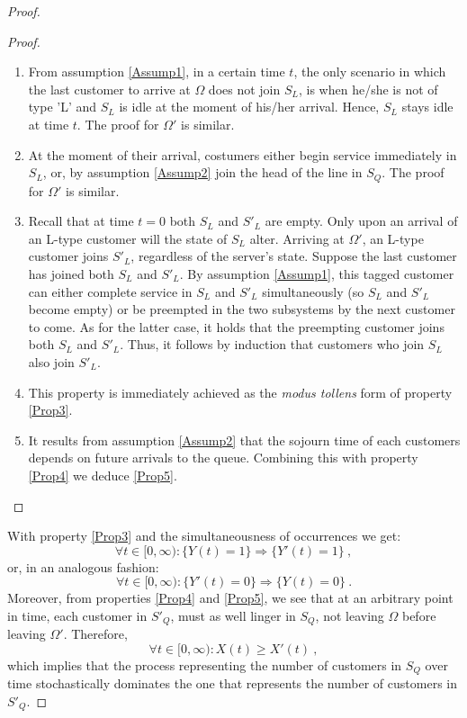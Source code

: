 \documentclass[11pt]{article}
\numberwithin{equation}{section}
\begin{document}
\begin{proof}
\begin{proof}
\begin{enumerate}[label=(\alph*)]
\item From assumption \ref{Assump1}, in a certain time $t$, the only scenario in which the last customer to arrive at $\Omega$ does not join $S_L$, is when he/she is not of type 'L' and $S_L$ is idle at the moment of his/her arrival. Hence, $S_L$ stays idle at time $t$. The proof for $\Omega'$ is similar.
\item At the moment of their arrival, costumers either begin service immediately in $S_L$, or, by assumption \ref{Assump2} join the head of the line in $S_Q$. The proof for $\Omega'$ is similar.
\item Recall that at time $t=0$ both $S_L$ and $S'_L$ are empty. Only upon an arrival of an L-type customer will the state of $S_L$ alter. Arriving at $\Omega'$, an L-type customer joins $S'_L$, regardless of the server's state. Suppose the last customer has joined both $S_L$ and $S'_L$. By assumption \ref{Assump1}, this tagged customer can either complete service in $S_L$ and $S'_L$ simultaneously (so $S_L$ and $S'_L$ become empty) or be preempted in the two subsystems by the next customer to come. As for the latter case, it holds that the preempting customer joins both $S_L$ and $S'_L$. Thus, it follows by induction that customers who join $S_L$ also join $S'_L$.
\item This property is immediately achieved as the {\it modus tollens} form of property \ref{Prop3}.
\item It results from assumption \ref{Assump2} that the sojourn time of each customers depends on future arrivals to the queue. Combining this with property \ref{Prop4} we deduce \ref{Prop5}. 
\end{enumerate}
\end{proof}

With property \ref{Prop3} and the simultaneousness of occurrences we get:
\[ \forall t  \in [0, \infty): \lbrace{ Y(t)=1 \rbrace} \Rightarrow \lbrace{ Y'(t)=1 \rbrace} \:, \]
or, in an analogous fashion:
\begin{equation}
\forall t  \in [0, \infty): \lbrace{ Y'(t)=0 \rbrace} \Rightarrow \lbrace{ Y(t)=0 \rbrace} \:.\label{BusyTimesComp}
\end{equation}
Moreover, from properties \ref{Prop4} and \ref{Prop5}, we see that at an arbitrary point in time, each customer in $S'_Q$, must as well linger in $S_Q$, not leaving $\Omega$ before leaving $\Omega'$. Therefore, 
\begin{equation}
\forall t \in [0, \infty):  X(t) \geq X'(t) \:, \label{StDomination}
\end{equation}
which implies that the process representing the number of customers in $S_Q$ over time stochastically dominates the one that represents the number of customers in $S'_Q$. 


\end{proof}
\end{document}
